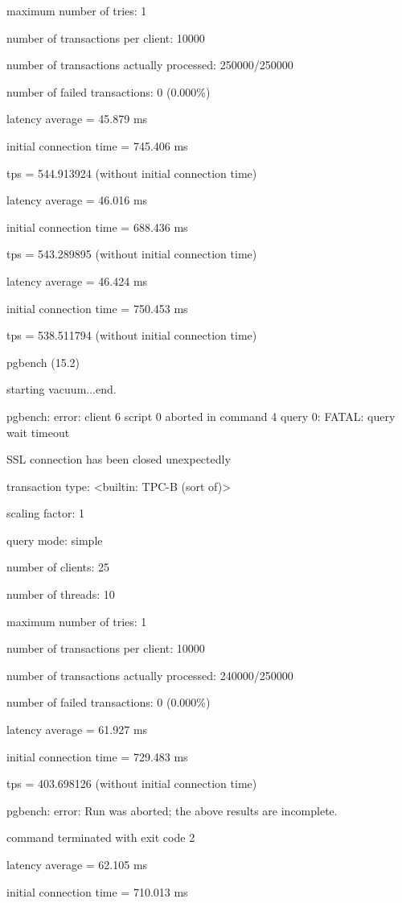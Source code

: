 maximum number of tries: 1

number of transactions per client: 10000

number of transactions actually processed: 250000/250000

number of failed transactions: 0 (0.000\%)

latency average = 45.879 ms

initial connection time = 745.406 ms

tps = 544.913924 (without initial connection time)

latency average = 46.016 ms

initial connection time = 688.436 ms

tps = 543.289895 (without initial connection time)

latency average = 46.424 ms

initial connection time = 750.453 ms

tps = 538.511794 (without initial connection time)


pgbench (15.2)

starting vacuum...end.

pgbench: error: client 6 script 0 aborted in command 4 query 0: FATAL:  query wait timeout

SSL connection has been closed unexpectedly

transaction type: <builtin: TPC-B (sort of)>

scaling factor: 1

query mode: simple

number of clients: 25

number of threads: 10

maximum number of tries: 1

number of transactions per client: 10000

number of transactions actually processed: 240000/250000

number of failed transactions: 0 (0.000\%)

latency average = 61.927 ms

initial connection time = 729.483 ms

tps = 403.698126 (without initial connection time)

pgbench: error: Run was aborted; the above results are incomplete.

command terminated with exit code 2

latency average = 62.105 ms

initial connection time = 710.013 ms

